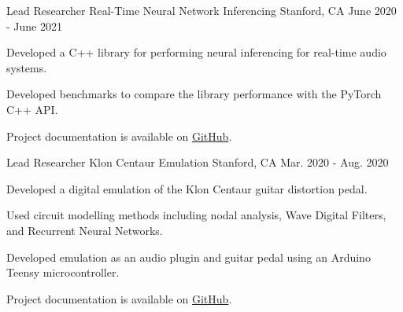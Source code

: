 
\begin{cventries}

  \cventry
    {Lead Researcher} %
    {Real-Time Neural Network Inferencing} %
    {Stanford, CA} %
    {June 2020 - June 2021} %
    {
      \begin{cvitems} %
        \item {Developed a C++ library for performing neural inferencing for real-time audio systems.}
        \item {Developed benchmarks to compare the library performance with the PyTorch C++ API.}
        \item {Project documentation is available on \href{https://github.com/jatinchowdhury18/RTNeural}{GitHub}.}
      \end{cvitems}
    }

  \cventry
    {Lead Researcher} %
    {Klon Centaur Emulation} %
    {Stanford, CA} %
    {Mar. 2020 - Aug. 2020} %
    {
      \begin{cvitems} %
        \item {Developed a digital emulation of the Klon Centaur guitar distortion pedal.}
        \item {Used circuit modelling methods including nodal analysis, Wave Digital Filters, and Recurrent Neural Networks.}
        \item {Developed emulation as an audio plugin and guitar pedal using an Arduino Teensy microcontroller.}
        \item {Project documentation is available on \href{https://github.com/jatinchowdhury18/KlonCentaur}{GitHub}.}
      \end{cvitems}
    }


\end{cventries}
